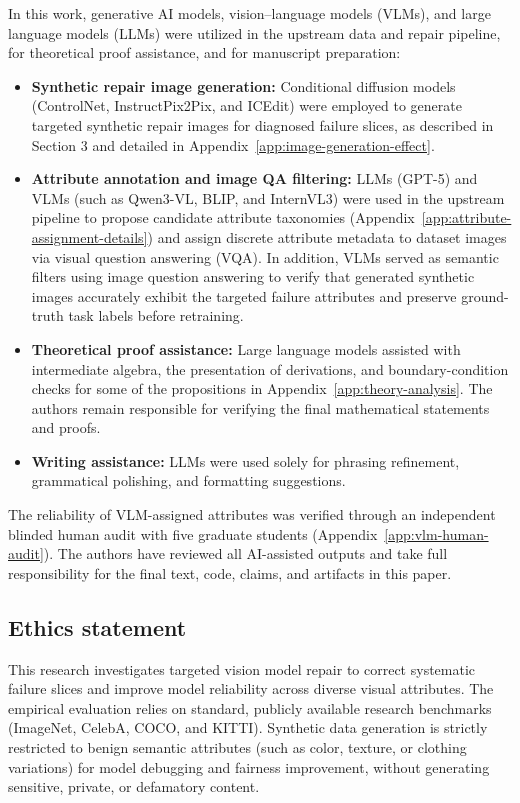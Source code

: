 \documentclass[10pt,twocolumn,letterpaper]{article}
\newcommand{\controlnet}{ControlNet\xspace}
\begin{document}
In this work, generative AI models, vision--language models (VLMs), and large language models (LLMs) were utilized in the upstream data and repair pipeline, for theoretical proof assistance, and for manuscript preparation:
\begin{itemize}[leftmargin=*,noitemsep,topsep=2pt]
    \item \textbf{Synthetic repair image generation:} Conditional diffusion models (\controlnet, InstructPix2Pix, and ICEdit) were employed to generate targeted synthetic repair images for diagnosed failure slices, as described in Section 3 and detailed in Appendix~\ref{app:image-generation-effect}.
    \item \textbf{Attribute annotation and image QA filtering:} LLMs (GPT-5) and VLMs (such as Qwen3-VL, BLIP, and InternVL3) were used in the upstream pipeline to propose candidate attribute taxonomies (Appendix~\ref{app:attribute-assignment-details}) and assign discrete attribute metadata to dataset images via visual question answering (VQA). In addition, VLMs served as semantic filters using image question answering to verify that generated synthetic images accurately exhibit the targeted failure attributes and preserve ground-truth task labels before retraining.
    \item \textbf{Theoretical proof assistance:} Large language models assisted with intermediate algebra, the presentation of derivations, and boundary-condition checks for some of the propositions in Appendix~\ref{app:theory-analysis}. The authors remain responsible for verifying the final mathematical statements and proofs.
    \item \textbf{Writing assistance:} LLMs were used solely for phrasing refinement, grammatical polishing, and formatting suggestions.
\end{itemize}
The reliability of VLM-assigned attributes was verified through an independent blinded human audit with five graduate students (Appendix~\ref{app:vlm-human-audit}). The authors have reviewed all AI-assisted outputs and take full responsibility for the final text, code, claims, and artifacts in this paper.

\subsection*{Ethics statement}

This research investigates targeted vision model repair to correct systematic failure slices and improve model reliability across diverse visual attributes. The empirical evaluation relies on standard, publicly available research benchmarks (ImageNet, CelebA, COCO, and KITTI). Synthetic data generation is strictly restricted to benign semantic attributes (such as color, texture, or clothing variations) for model debugging and fairness improvement, without generating sensitive, private, or defamatory content.
\end{document}
